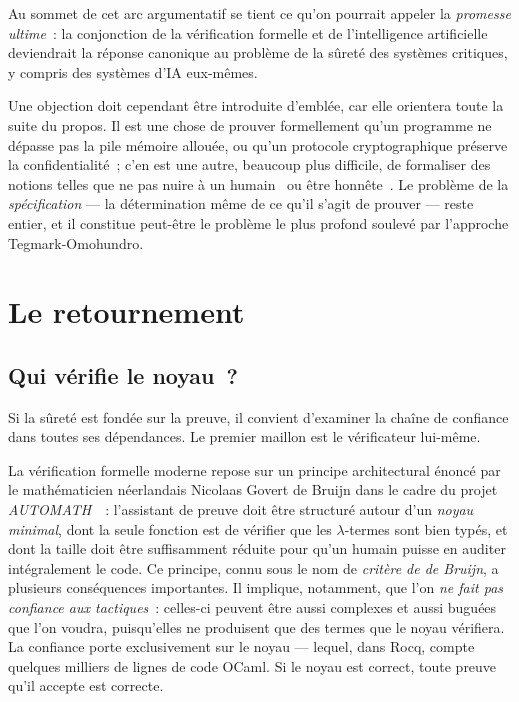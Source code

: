 \documentclass[11pt,a4paper]{article}
\begin{document}
Au sommet de cet arc argumentatif se tient ce qu'on pourrait appeler la \emph{promesse ultime}~: la conjonction de la vérification formelle et de l'intelligence artificielle deviendrait la réponse canonique au problème de la sûreté des systèmes critiques, y compris des systèmes d'IA eux-mêmes.

Une objection doit cependant être introduite d'emblée, car elle orientera toute la suite du propos. Il est une chose de prouver formellement qu'un programme ne dépasse pas la pile mémoire allouée, ou qu'un protocole cryptographique préserve la confidentialité~; c'en est une autre, beaucoup plus difficile, de formaliser des notions telles que \og ne pas nuire à un humain~\fg{} ou \og être honnête~\fg{}. Le problème de la \emph{spécification} --- la détermination même de ce qu'il s'agit de prouver --- reste entier, et il constitue peut-être le problème le plus profond soulevé par l'approche Tegmark-Omohundro.

\bigskip

\section{Le retournement}

\subsection{Qui vérifie le noyau~?}

Si la sûreté est fondée sur la preuve, il convient d'examiner la chaîne de confiance dans toutes ses dépendances. Le premier maillon est le vérificateur lui-même.

La vérification formelle moderne repose sur un principe architectural énoncé par le mathématicien néerlandais Nicolaas Govert de Bruijn dans le cadre du projet \emph{AUTOMATH}~\parencite{debruijn1980automath}~: l'assistant de preuve doit être structuré autour d'un \emph{noyau minimal}, dont la seule fonction est de vérifier que les $\lambda$-termes sont bien typés, et dont la taille doit être suffisamment réduite pour qu'un humain puisse en auditer intégralement le code. Ce principe, connu sous le nom de \emph{critère de de Bruijn}, a plusieurs conséquences importantes. Il implique, notamment, que l'on \emph{ne fait pas confiance aux tactiques}~: celles-ci peuvent être aussi complexes et aussi buguées que l'on voudra, puisqu'elles ne produisent que des termes que le noyau vérifiera. La confiance porte exclusivement sur le noyau --- lequel, dans Rocq, compte quelques milliers de lignes de code OCaml. Si le noyau est correct, toute preuve qu'il accepte est correcte.
\end{document}
